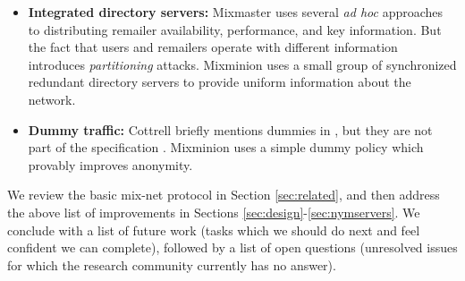 \documentclass[11pt]{IEEEtran}
\begin{document}
\begin{itemize}
\item \textbf{Integrated directory servers:} Mixmaster uses several \emph{ad hoc}
approaches to distributing remailer availability, performance, and
key information. But the fact that users and remailers operate with
different information introduces \emph{partitioning} attacks. Mixminion
uses a small group of synchronized redundant directory servers
to provide uniform information about the network.

\item \textbf{Dummy traffic:} Cottrell briefly mentions dummies in
\cite{mixmaster-attacks}, but they are not part of the specification
\cite{mixmaster-spec}. Mixminion uses a simple dummy policy which provably
improves anonymity. %

\end{itemize}


We review the basic mix-net protocol in Section \ref{sec:related},
and then address the above list of improvements in Sections
\ref{sec:design}-\ref{sec:nymservers}. We conclude with a list of future
work (tasks which we should do next and feel confident we can complete),
followed by a list of open questions (unresolved issues for which the
research community currently has no answer).



\end{document}
